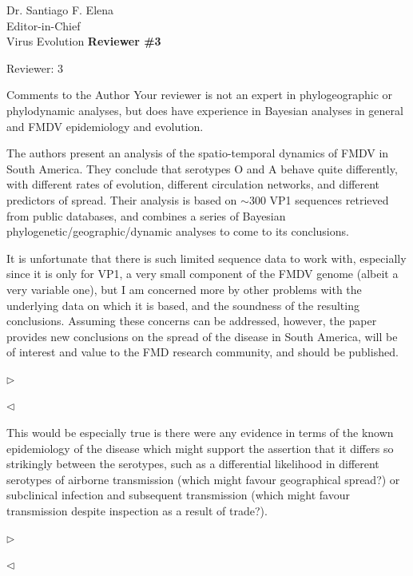 \documentclass[ucla,biomath,12pt,noaddrfooter,datefrom]{UC_letter}
\newenvironment{reply}{$\triangleright$\bf}{$\triangleleft$}
\begin{document}
\begin{letter}{
Dr. Santiago F. Elena \\
Editor-in-Chief \\
Virus Evolution
}
\textbf{Reviewer \#3}

Reviewer: 3

Comments to the Author
Your reviewer is not an expert in phylogeographic or phylodynamic analyses, but does have experience in Bayesian analyses in general and FMDV epidemiology and evolution.

The authors present an analysis of the spatio-temporal dynamics of FMDV in South America. 
They conclude that serotypes O and A behave quite differently, with different rates of evolution, different circulation networks, and different predictors of spread. 
Their analysis is based on $\sim$300 VP1 sequences retrieved from public databases, and combines a series of Bayesian phylogenetic/geographic/dynamic analyses to come to its conclusions.

It is unfortunate that there is such limited sequence data to work with, especially since it is only for VP1, a very small component of the FMDV genome (albeit a very variable one), but I am concerned more by other problems with the underlying data on which it is based, and the soundness of the resulting conclusions. 
Assuming these concerns can be addressed, however, the paper provides new conclusions on the spread of the disease in South America, will be of interest and value to the FMD research community, and should be published.

\begin{reply}

\end{reply}

This would be especially true is there were any evidence in terms of the known epidemiology of the disease which might support the assertion that it differs so strikingly between the serotypes, such as a differential likelihood in different serotypes of airborne transmission (which might favour geographical spread?) or subclinical infection and subsequent transmission (which might favour transmission despite inspection as a result of trade?).

\begin{reply}

\end{reply}


\end{letter}
\end{document}
